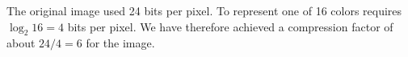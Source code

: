 \begin{answer}
The original image used 24 bits per pixel. To represent one of 16 colors requires $\log_2 16 = 4$ bits per pixel. We have therefore achieved a compression factor of about $24 / 4 = 6$ for the image.
\end{answer}
